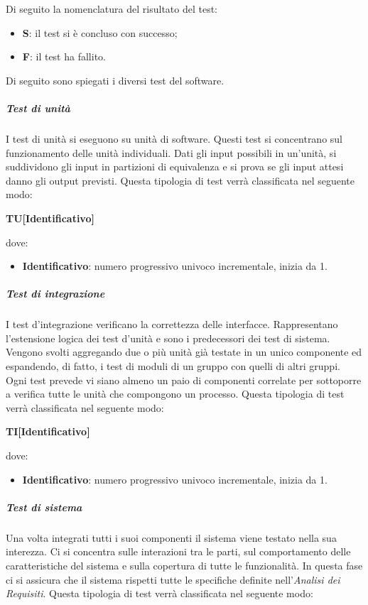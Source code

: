 			Di seguito la nomenclatura del risultato del test:
			\begin{itemize}
				\item \textbf{S}: il test si è concluso con successo;
				\item \textbf{F}: il test ha fallito.
			\end{itemize}		
			Di seguito sono spiegati i diversi test del software.
			\subparagraph{Test di unità}
			I test di unità si eseguono su unità di software. Questi test si concentrano sul funzionamento delle unità individuali. Dati gli input possibili in un'unità, si suddividono gli input in partizioni di equivalenza e si prova se gli input attesi danno gli output previsti.
			Questa tipologia di test verrà classificata nel seguente modo:
			\begin{center}
				\textbf{TU[Identificativo]}
			\end{center}
			dove:
			\begin{itemize}
				\item \textbf{Identificativo}: numero progressivo univoco incrementale, inizia da 1.
			\end{itemize}
			\subparagraph{Test di integrazione}
			I test d’integrazione verificano la correttezza delle interfacce. Rappresentano l’estensione logica dei test d’unità e sono i predecessori dei test di sistema. Vengono svolti aggregando due o più unità già testate in un unico componente ed espandendo, di fatto, i test di moduli di un gruppo con quelli di altri gruppi. Ogni test prevede vi siano almeno un paio di componenti correlate per sottoporre a verifica tutte le unità che compongono un processo.
			Questa tipologia di test verrà classificata nel seguente modo:
			\begin{center}
				\textbf{TI[Identificativo]}
			\end{center}
			dove:
			\begin{itemize}
				\item \textbf{Identificativo}: numero progressivo univoco incrementale, inizia da 1.
			\end{itemize}
			\subparagraph{Test di sistema}
			Una volta integrati tutti i suoi componenti il sistema viene testato nella sua interezza. Ci si concentra sulle interazioni tra le parti, sul comportamento delle caratteristiche del sistema e sulla copertura di tutte le funzionalità. In questa fase ci si assicura che il sistema rispetti tutte le specifiche definite nell'\textit{Analisi dei Requisiti}.
			Questa tipologia di test verrà classificata nel seguente modo:
